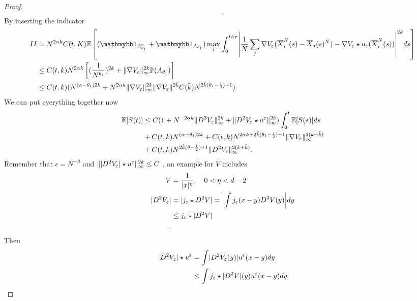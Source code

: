\begin{proof}
\begin{align*}
.\end{align*}
By inserting the indicator
\begin{align*}
  II &= N^{2 \alpha  k} C(t,K) \E\left[(\cha_{A_{\theta_{1}}^{c} } + \cha_{A_{\theta_{1}}}) \max_{i}\int_0^{t \land \tau }  \abs*{\frac{1}{N} \sum_{j} \nabla V_{\epsilon}(\overline{X}_i^{N}(s) - \overline{X}_{j}(s)^{N}  ) - \nabla V_{\epsilon} \star  u_{\epsilon}(\overline{X}_i^{N}(s) )}^{2k} ds  \right]\\
     &\le  C(t,k)N^{2 \alpha  k}  \left[ (\frac{1}{N^{\theta_1} })^{2k} + \|\nabla V_{\epsilon}\|_{\infty}^{2k} \P(A_{\theta_1})   \right]  \\
     &\le C(t,k)(N^{(\alpha -\theta_1)2k} + N^{2 \alpha  k}  \|\nabla V_{\epsilon}\|_{\infty}^{2k}  \|\nabla V_\epsilon\|^{2 \tilde{k} } C(\tilde{k} )N^{2 \tilde{k}(\theta_1 - \frac{1}{2}) + 1 }) 
.\end{align*}
We can put everything together now 
\begin{align*}
  \mathbb{E}[S(t)] &\le  C(1 + N^{-2 \alpha  k} \|D^{3}V_\varepsilon \|_{\infty}^{2k}   + \|D^2 V_{\varepsilon} \star  u^{\varepsilon} \|_{\infty}^{2k} ) \int_0^{t} \mathbb{E}[S(s)] ds\\
           &+ C(t,k)N^{(\alpha  - \theta_1)2k} +  C(t,k)N^{2 \alpha  k + 2 \tilde{k}(\theta_1 - \frac{1}{2}) + 1 } \|\nabla V_{\varepsilon}\|_{\infty}^{2(k+\tilde{k} )} \\
           &+ C(t,k)N^{2 \tilde{k}(\theta  - \frac{1}{2}) + 1 } \|D^2V_{\varepsilon}\|_{\infty}^{2(k+\tilde{k} )}  
.\end{align*}
Remember that $\epsilon = N^{-\beta } $ and $\|\lvert D^2 V_\varepsilon\rvert \star  u^{\varepsilon}  \|_{\infty}^{2k} \le C $ , an example for $V$ includes 
\begin{align*}
  V  &= \frac{1}{\abs{x}^{\eta }  }   ,\quad 0 < \eta  < d-2\\
  \abs{D^2 V_\epsilon} &= \abs{j_{\epsilon} \star  D^2V} = \abs*{\int j_{\epsilon}(x-y) D^2 V(y)} dy  \\
                       &\le  j_\epsilon \star \abs{D^2 V} \\
.\end{align*}
Then 
\begin{align*}
  \abs{D^2 V_{\epsilon}} \star  u^{\epsilon}  &= \int \abs{D^2 V_{\epsilon}(y)} u^{\epsilon}(x-y)dy\\
                                              &\le  \int  j_{\epsilon} \star  \abs{D^2 V}(y) u^{\epsilon}(x-y)dy \\

\end{align*}
\end{proof}
